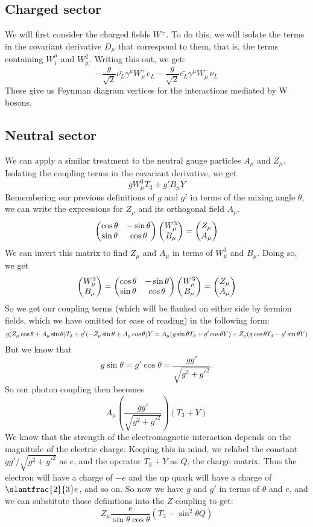 \subsection{Charged sector}
We will first consider the charged fields $W^\pm$. To do this, we will isolate the terms in the covariant derivative $D_\mu$ that correspond to them, that is, the terms containing $W_1^\mu$ and $W_\mu^2$. Writing this out, we get:
$$-\frac{g}{\sqrt{2}}\bar{\nu_L}\gamma^\mu W_\mu^+ e_L - \frac{g}{\sqrt{2}}\bar{e_L}\gamma^\mu W_\mu^- \nu_L$$
These give us Feynman diagram vertices for the interactions mediated by W bosons.
\subsection{Neutral sector}
We can apply a similar treatment to the neutral gauge particles $A_\mu$ and $Z_\mu$. Isolating the coupling terms in the covariant derivative, we get
\[gW_\mu^3T_3 + g'B_\mu Y\]
Remembering our previous definitions of $g$ and $g'$ in terms of the mixing angle $\theta$, we can write the expressions for $Z_\mu$ and its orthogonal field $A_\mu$.
\newcommand{\ct}{\cos\theta}
\newcommand{\st}{\sin\theta}
$$
\fourmatrix{\ct}{-\st}{\st}{\ct}
\vdoublet{W_{\mu}^{3}}{B_{\mu}} =  \vdoublet{Z_\mu}{A_\mu}
$$
We can invert this matrix to find $Z_\mu$ and $A_\mu$ in terms of $W_\mu^3$ and $B_\mu$. Doing so, we get
$$\begin{pmatrix} W_\mu^3 \\ B_\mu\end{pmatrix} = \begin{pmatrix} \cos\theta & -\sin\theta \\ \sin\theta & \cos\theta\end{pmatrix}\begin{pmatrix} W_{\mu}^{3} \\ B_{\mu}\end{pmatrix} =  \begin{pmatrix} Z_\mu \\ A_\mu\end{pmatrix}$$
So we get our coupling terms (which will be flanked on either side by fermion fields, which we have omitted for ease of reading) in the following form:
$$
g(Z_\mu\ct+A_\mu\st)T_3 + g'(-Z_\mu\st+A_\mu\ct)Y\\
= A_\mu(g\st T_3 + g'\ct Y) + Z_\mu(g\ct T_3 - g'\st Y)
$$
But we know that $$g\st = g'\ct = \frac{gg'}{\sqrt{g^2 + g'^2}}.$$
So our photon coupling then becomes 
$$A_\mu\left(\frac{gg'}{\sqrt{g^2 + g'^2}}\right)(T_3 + Y)$$
We know that the strength of the electromagnetic interaction depends on the magnitude of the electric charge. Keeping this in mind, we relabel the constant $gg'/\sqrt{g^2 + g'^2}$ as $e$, and the operator $T_3 + Y$ as $Q$, the charge matrix. Thus the electron will have a charge of $-e$ and the up quark will have a charge of $\slantfrac{2}{3} e$, and so on. So now we have $g$ and $g'$ in terms of $\theta$ and $e$, and we can substitute those definitions into the $Z$ coupling to get:
$$Z_\mu\frac{e}{\st\ct}(T_3 - \sin^2\theta Q)$$

